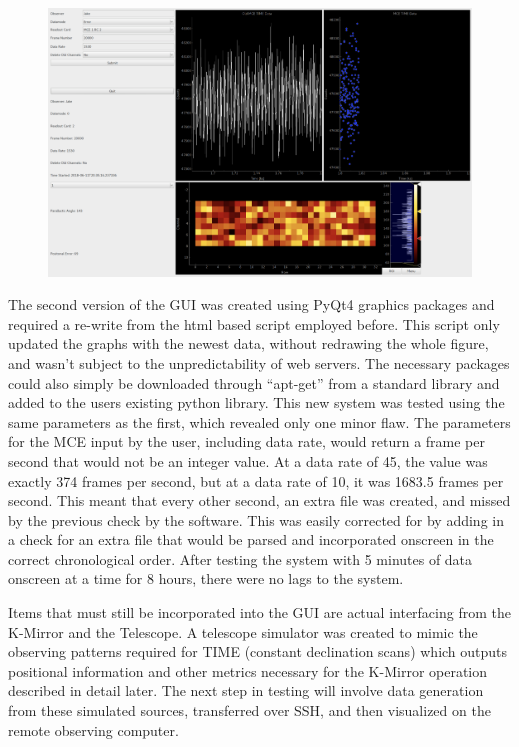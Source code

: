 \documentclass[manuscript]{aastex}
\begin{document}
\begin{figure}[ht!]
	\centering
	\includegraphics[width=\textwidth]{gui2.png}%
	\caption[GUI Beta 2.0]{}%
	\label{fig:gui2}%
\end{figure}

The second version of the GUI was created using PyQt4 graphics packages and required a re-write from the html based script employed before. This script only updated the graphs with the newest data, without redrawing the whole figure, and wasn't subject to the unpredictability of web servers. The necessary packages could also simply be downloaded through ``apt-get'' from a standard library and added to the users existing python library. This new system was tested using the same parameters as the first, which revealed only one minor flaw. The parameters for the MCE input by the user, including data rate, would return a frame per second that would not be an integer value. At a data rate of 45, the value was exactly 374 frames per second, but at a data rate of 10, it was 1683.5 frames per second. This meant that every other second, an extra file was created, and missed by the previous check by the software. This was easily corrected for by adding in a check for an extra file that would be parsed and incorporated onscreen in the correct chronological order. After testing the system with 5 minutes of data onscreen at a time for 8 hours, there were no lags to the system. 

Items that must still be incorporated into the GUI are actual interfacing from the K-Mirror and the Telescope. A telescope simulator was created to mimic the observing patterns required for TIME (constant declination scans) which outputs positional information and other metrics necessary for the K-Mirror operation described in detail later. The next step in testing will involve data generation from these simulated sources, transferred over SSH, and then visualized on the remote observing computer. 
\end{document}
